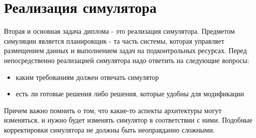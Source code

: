 \section{Реализация симулятора}

Вторая и основная задача диплома - это реализация симулятора. Предметом симуляции является планировщик - та часть системы, которая управляет размещением данных и выполнением задач на подконтрольных ресурсах. Перед непосредственно реализацией симулятора надо ответить на следующие вопросы:

\begin{itemize}
	\item каким требованиям должен отвечать симулятор
	\item есть ли готовые решения либо решения, которые удобны для модификации
\end{itemize}

Причем важно помнить о том, что какие-то аспекты архитектуры могут изменяться, и нужно будет изменять симулятор в соответствии с ними. Подобные корректировки симулятора не должны быть неоправданно сложными.